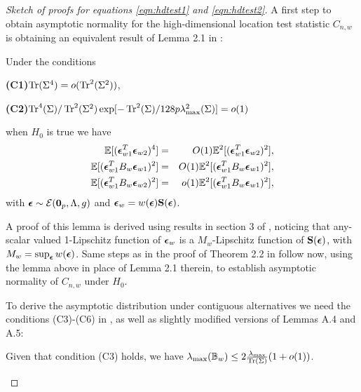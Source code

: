 \begin{proof}[Sketch of proofs for equations \ref{eqn:hdtest1} and \ref{eqn:hdtest2}]

A first step to obtain asymptotic normality for the high-dimensional location test statistic $C_{n,w}$ is obtaining an equivalent result of Lemma 2.1 in \cite{WangPengLi15}:

\begin{Lemma}\label{Lemma:HDlemma21} Under the conditions

\noindent\textbf{(C1)}$\operatorname*{Tr}(\Sigma^4) = o(\operatorname*{Tr}^2(\Sigma^2)) $,

\noindent\textbf{(C2)}$\operatorname*{Tr}^4(\Sigma) / \operatorname*{Tr}^2(\Sigma^2) \exp[ - \operatorname*{Tr}^2(\Sigma) / 128p \lambda^2_{\max}(\Sigma) ] = o(1)$
\vspace{1em}

\noindent when $H_0$ is true we have
%
\begin{eqnarray}
{\mathbb{E}}[ ({\boldsymbol{\epsilon}}_{w1}^T {\boldsymbol{\epsilon}}_{w2})^4 ] &=& O(1) {\mathbb{E}}^2[ ({\boldsymbol{\epsilon}}_{w1}^T {\boldsymbol{\epsilon}}_{w2})^2 ],\\
{\mathbb{E}}[ ({\boldsymbol{\epsilon}}_{w1}^T B_w {\boldsymbol{\epsilon}}_{w1})^2 ] &=& O(1) {\mathbb{E}}^2[ ({\boldsymbol{\epsilon}}_{w1}^T B_w {\boldsymbol{\epsilon}}_{w1})^2 ],\\
{\mathbb{E}}[ ({\boldsymbol{\epsilon}}_{w1}^T B_w {\boldsymbol{\epsilon}}_{w2})^2 ] &=& o(1) {\mathbb{E}}^2[ ({\boldsymbol{\epsilon}}_{w1}^T B_w {\boldsymbol{\epsilon}}_{w1})^2 ],
\end{eqnarray}
%
with ${\boldsymbol{\epsilon}} \sim \mathcal E({\bf 0}_p, \Lambda, g)$ and ${\boldsymbol{\epsilon}}_w = w({\boldsymbol{\epsilon}}) {\mathbf{S}}({\boldsymbol{\epsilon}})$.
\end{Lemma}
%
A proof of this lemma is derived using results in section 3 of \cite{ElKaroui09}, noticing that any-scalar valued 1-Lipschitz function of ${\boldsymbol{\epsilon}}_w$ is a $M_w$-Lipschitz function of ${\mathbf{S}}({\boldsymbol{\epsilon}})$, with $M_w = \sup_{\boldsymbol{\epsilon}} w({\boldsymbol{\epsilon}})$. Same steps as in the proof of Theorem 2.2 in \cite{WangPengLi15} follow now, using the lemma above in place of Lemma 2.1 therein, to establish asymptotic normality of $C_{n,w}$ under $H_0$.

To derive the asymptotic distribution under contiguous alternatives we need the conditions (C3)-(C6) in \cite{WangPengLi15}, as well as slightly modified versions of Lemmas A.4 and A.5:

\begin{Lemma}
Given that condition (C3) holds, we have $\lambda_{\max} ({\mathbb{B}}_w) \leq 2 \frac{\lambda_{\max}}{\text{Tr} (\Sigma)} (1+o(1))$.
\end{Lemma}


\end{proof}
